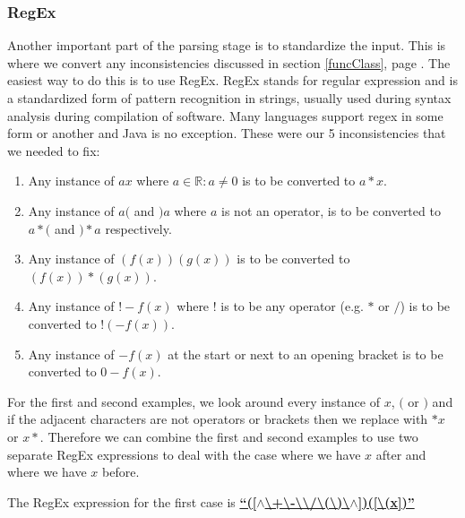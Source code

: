 \documentclass[../../../../../main.tex]{subfiles}
\begin{document}
\subsubsection{RegEx}
Another important part of the parsing stage is to standardize the input. This is where we convert any inconsistencies discussed in section \ref{funcClass}, page \pageref{funcClass}. The easiest way to do this is to use RegEx. RegEx stands for regular expression and is a standardized form of pattern recognition in strings, usually used during syntax analysis during compilation of software. Many languages support regex in some form or another and Java is no exception. These were our 5 inconsistencies that we needed to fix:
\begin{enumerate}
	\item Any instance of $ax$ where $a \in  \mathbb{R} : a \neq 0$ is to be converted to $a*x$.
	\item Any instance of $a($ and $)a$ where $a$ is not an operator, is to be converted to $a*($ and $)*a$ respectively.
	\item Any instance of $(f(x))(g(x))$ is to be converted to $(f(x))*(g(x))$.
	\item Any instance of $!-f(x)$ where $!$ is to be any operator (e.g. $*$ or $/$) is to be converted to $! (-f(x))$.
	\item Any instance of $-f(x)$ at the start or next to an opening bracket is to be converted to $0 - f(x)$.
\end{enumerate}
For the first and second examples, we look around every instance of $x$, $($ or $)$ and if the adjacent characters are not operators or brackets then we replace with $*x$ or $x*$. Therefore we can combine the first and second examples to use two separate RegEx expressions to deal with the case where we have $x$ after and where we have $x$ before.\par
The RegEx expression for the first case is
\textbf{\underline{``([$\wedge$\textbackslash+\textbackslash-\textbackslash*\textbackslash/\textbackslash(\textbackslash)\textbackslash$\wedge$])([\textbackslash(x])''}}
\end{document}
